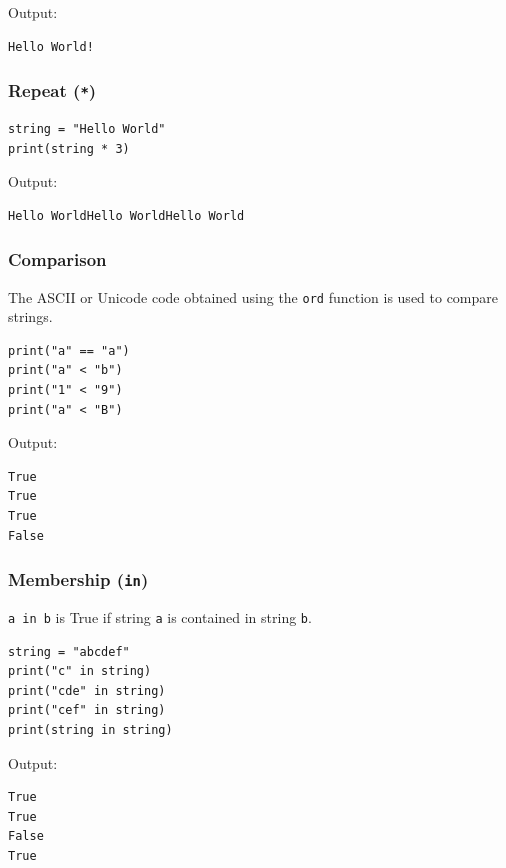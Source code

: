 \documentclass[11pt]{article}
\begin{document}
 \noindent Output:

\begin{verbatim}
Hello World!
\end{verbatim}

\subsubsection{Repeat (\texttt{*})}
\label{sec:org9cd187b}
\begin{verbatim}
string = "Hello World"
print(string * 3)
\end{verbatim}

 \noindent Output:

\begin{verbatim}
Hello WorldHello WorldHello World
\end{verbatim}

\subsubsection{Comparison}
\label{sec:org897f90e}
The ASCII or Unicode code obtained using the \texttt{ord} function is used to compare strings.
\begin{verbatim}
print("a" == "a")
print("a" < "b")
print("1" < "9")
print("a" < "B")
\end{verbatim}

 \noindent Output:

\begin{verbatim}
True
True
True
False
\end{verbatim}

\subsubsection{Membership (\texttt{in})}
\label{sec:org350b8a1}
\texttt{a in b} is True if string \texttt{a} is contained in string \texttt{b}.
\begin{verbatim}
string = "abcdef"
print("c" in string)
print("cde" in string)
print("cef" in string)
print(string in string)
\end{verbatim}

 \noindent Output:

\begin{verbatim}
True
True
False
True
\end{verbatim}
\end{document}

